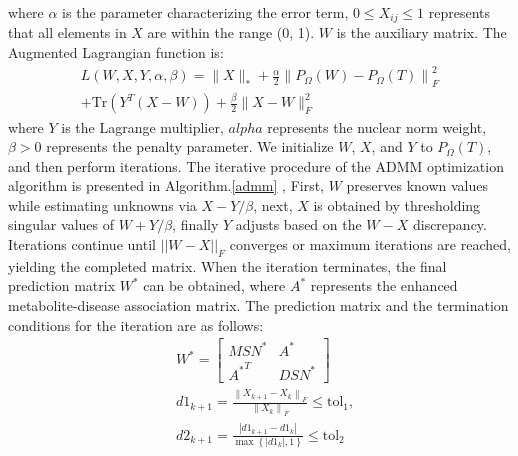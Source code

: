 \documentclass[a4paper,fleqn]{cas-dc}
\begin{document}
where \( \alpha \) is the parameter characterizing the error term, \( 0 \leq X_{ij} \leq 1 \) represents that all elements in \( X \) are within the range (0, 1). \( W \) is the auxiliary matrix. The Augmented Lagrangian function is:
\begin{equation}
	\begin{split}
		L(W, X, Y, \alpha, \beta) = 
		 \|X\|_* + \frac{\alpha}{2} \left\| P_{\Omega}(W) - P_{\Omega}(T) \right\|_F^2  \\
		+ \text{Tr}(Y^T (X - W)) +\frac{\beta}{2} \|X - W\|_F^2
	\end{split}
\end{equation}
where \( Y \) is the Lagrange multiplier, \(alpha\) represents the nuclear norm weight, \( \beta > 0 \) represents the penalty parameter. We initialize \( W \), \( X \), and \( Y \) to \( P_{\Omega}(T) \), and then perform iterations. 
The iterative procedure of the ADMM optimization algorithm is presented in Algorithm.\ref{admm} , First, \(W\) preserves known values while estimating unknowns via \(X-Y/\beta \), next, \(X\) is obtained by thresholding singular values of \(W+Y/\beta \), finally \(Y\) adjusts based on the \(W-X\) discrepancy. Iterations continue until \(||W-X||_F\) converges or maximum iterations are reached, yielding the completed matrix. 
When the iteration terminates, the final prediction matrix \( W^* \) can be obtained, where \( A^* \) represents the enhanced metabolite-disease association matrix. The prediction matrix and the termination conditions for the iteration are as follows:
\begin{equation}
	\begin{split}
		& W^* = \begin{bmatrix} MSN^* & A^* \\ {A^*}^T & DSN^* \end{bmatrix} \\
		& d1_{k+1} = \frac{\left\| X_{k+1} - X_k \right\|_F}{\left\| X_k \right\|_F} \leq \text{tol}_1 , \\
		& d2_{k+1} = \frac{\left| d1_{k+1} - d1_{k} \right|}{\max\left\{ \left| d1_{k} \right|, 1 \right\}} \leq \text{tol}_2
	\end{split}
\end{equation}
\end{document}
